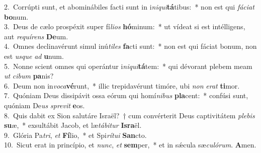 {2.~}Corrúpti sunt, et abominábiles facti sunt in i\textit{ni}\textit{qui}\textbf{tá}tibus:~* non est qui \textit{fá}\textit{ci}\textit{at} \textbf{bo}num.\\
{3.~}Deus de cælo prospéxit super fí\textit{li}\textit{os} \textbf{hó}minum:~* ut vídeat si est intélligens, aut \textit{re}\textit{quí}\textit{rens} \textbf{De}um.\\
{4.~}Omnes declinavérunt simul inú\textit{ti}\textit{les} \textbf{fa}cti sunt:~* non est qui fáciat bonum, non est \textit{us}\textit{que} \textit{ad} \textbf{u}num.\\
{5.~}Nonne scient omnes qui operántur i\textit{ni}\textit{qui}\textbf{tá}tem:~* qui dévorant plebem meam \textit{ut} \textit{ci}\textit{bum} \textbf{pa}nis?\\
{6.~}Deum non in\textit{vo}\textit{ca}\textbf{vé}runt,~* illic trepidavérunt timóre, ubi \textit{non} \textit{e}\textit{rat} \textbf{ti}mor.\\
{7.~}Quóniam Deus dissipávit ossa eórum qui homí\textit{ni}\textit{bus} \textbf{pla}cent:~* confúsi sunt, quóniam De\textit{us} \textit{spre}\textit{vit} \textbf{e}os.\\
{8.~}Quis dabit ex Sion salutáre Israël?~† cum convérterit Deus captivitátem \textit{ple}\textit{bis} \textbf{su}æ,~* exsultábit Jacob, et læ\textit{tá}\textit{bi}\textit{tur} \textbf{Is}\textbf{ra}ël.\\
{9.~}Glória Pa\textit{tri}, \textit{et} \textbf{Fí}lio,~* et Spi\textit{rí}\textit{tu}\textit{i} \textbf{San}cto.\\
{10.~}Sicut erat in princípio, et \textit{nunc}, \textit{et} \textbf{sem}per,~* et in sǽcula sæ\textit{cu}\textit{ló}\textit{rum}. \textbf{A}men.\\
